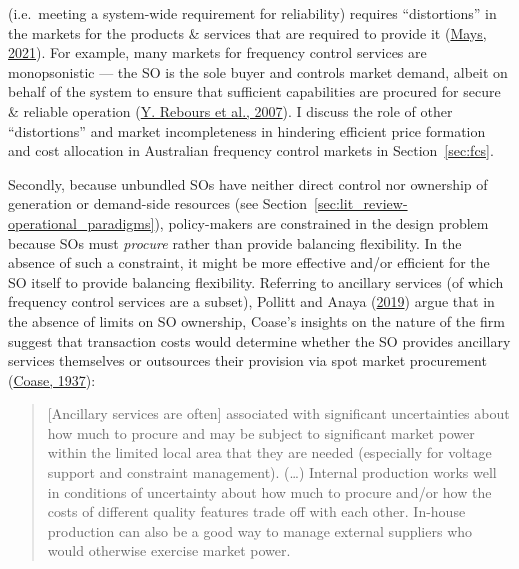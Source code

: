 \documentclass[12pt,a4paper,]{report}
\begin{document}
(i.e.~meeting a system-wide requirement for reliability) requires
``distortions'' in the markets for the products \& services that are
required to provide it
(\protect\hyperlink{ref-maysMissingIncentivesFlexibility2021}{Mays,
2021}). For example, many markets for frequency control services are
monopsonistic --- the SO is the sole buyer and controls market demand,
albeit on behalf of the system to ensure that sufficient capabilities
are procured for secure \& reliable operation
(\protect\hyperlink{ref-reboursFundamentalDesignIssues2007}{Y. Rebours
et al., 2007}). I discuss the role of other ``distortions'' and market
incompleteness in hindering efficient price formation and cost
allocation in Australian frequency control markets in
Section~\ref{sec:fcs}.

Secondly, because unbundled SOs have neither direct control nor
ownership of generation or demand-side resources (see
Section~\ref{sec:lit_review-operational_paradigms}), policy-makers are
constrained in the design problem because SOs must \emph{procure} rather
than provide balancing flexibility. In the absence of such a constraint,
it might be more effective and/or efficient for the SO itself to provide
balancing flexibility. Referring to ancillary services (of which
frequency control services are a subset), Pollitt and Anaya
(\protect\hyperlink{ref-pollittCompetitionMarketsAncillary2019}{2019})
argue that in the absence of limits on SO ownership, Coase's insights on
the nature of the firm suggest that transaction costs would determine
whether the SO provides ancillary services themselves or outsources
their provision via spot market procurement
(\protect\hyperlink{ref-coaseNatureFirm1937}{Coase, 1937}):

\begin{quote}
{[}Ancillary services are often{]} associated with significant
uncertainties about how much to procure and may be subject to
significant market power within the limited local area that they are
needed (especially for voltage support and constraint management).
(\ldots) Internal production works well in conditions of uncertainty
about how much to procure and/or how the costs of different quality
features trade off with each other. In-house production can also be a
good way to manage external suppliers who would otherwise exercise
market power.
\end{quote}
\end{document}
